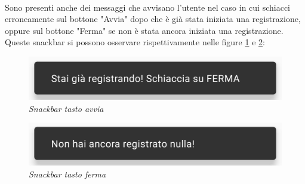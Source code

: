 \\Sono presenti anche dei messaggi che avvisano l'utente nel caso in cui schiacci erroneamente sul bottone "Avvia" dopo che è già stata iniziata una registrazione, oppure sul bottone "Ferma" se non è stata ancora iniziata una registrazione.
\\Queste snackbar si possono osservare rispettivamente nelle figure \ref{fig:snackavvia} e \ref{fig:snackferma}:
\begin{figure}[!h]
    \centering
	\includegraphics[scale=0.3]{Tesi/images/SnackAvvia.jpg}
	\caption{\textit{Snackbar tasto avvia}}
	\label{fig:snackavvia}
\end{figure}
\begin{figure}[!h]
    \centering
	\includegraphics[scale=0.3]{Tesi/images/SnackFerma.jpg}
	\caption{\textit{Snackbar tasto ferma}}
	\label{fig:snackferma}
\end{figure}\pagebreak

